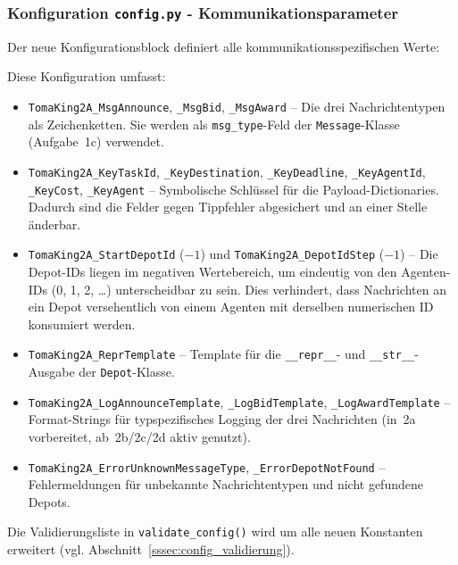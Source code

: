 \subsubsection{Konfiguration \texttt{config.py} - Kommunikationsparameter}

Der neue Konfigurationsblock definiert alle kommunikationsspezifischen Werte:



Diese Konfiguration umfasst:
\begin{itemize}
    \item \texttt{TomaKing2A\_MsgAnnounce}, \texttt{\_MsgBid}, \texttt{\_MsgAward} -- Die drei Nachrichtentypen als Zeichenketten. Sie werden als \texttt{msg\_type}-Feld der \texttt{Message}-Klasse (Aufgabe~1c) verwendet.
    \item \texttt{TomaKing2A\_KeyTaskId}, \texttt{\_KeyDestination}, \texttt{\_KeyDeadline}, \texttt{\_KeyAgentId}, \texttt{\_KeyCost}, \texttt{\_KeyAgent} -- Symbolische Schlüssel für die Payload-Dictionaries. Dadurch sind die Felder gegen Tippfehler abgesichert und an einer Stelle änderbar.
    \item \texttt{TomaKing2A\_StartDepotId} (\(-1\)) und \texttt{TomaKing2A\_DepotIdStep} (\(-1\)) -- Die Depot-IDs liegen im negativen Wertebereich, um eindeutig von den Agenten-IDs (0, 1, 2, \ldots) unterscheidbar zu sein. Dies verhindert, dass Nachrichten an ein Depot versehentlich von einem Agenten mit derselben numerischen ID konsumiert werden.
    \item \texttt{TomaKing2A\_ReprTemplate} -- Template für die \texttt{\_\_repr\_\_}- und \texttt{\_\_str\_\_}-Ausgabe der \texttt{Depot}-Klasse.
    \item \texttt{TomaKing2A\_LogAnnounceTemplate}, \texttt{\_LogBidTemplate}, \texttt{\_LogAwardTemplate} -- Format-Strings für typspezifisches Logging der drei Nachrichten (in~2a vorbereitet, ab~2b/2c/2d aktiv genutzt).
    \item \texttt{TomaKing2A\_ErrorUnknownMessageType}, \texttt{\_ErrorDepotNotFound} -- Fehlermeldungen für unbekannte Nachrichtentypen und nicht gefundene Depots.
\end{itemize}

Die Validierungsliste in \texttt{validate\_config()} wird um alle neuen Konstanten erweitert (vgl. Abschnitt~\ref{sssec:config_validierung}).

